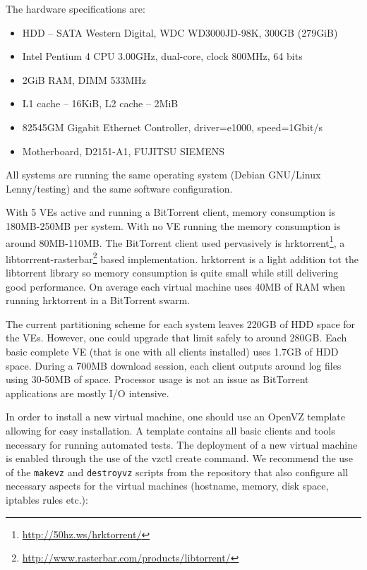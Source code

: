 The hardware specifications are:

\begin{itemize}
  \item HDD -- SATA Western Digital, WDC WD3000JD-98K, 300GB (279GiB)
  \item Intel Pentium 4 CPU 3.00GHz, dual-core, clock 800MHz, 64 bits
  \item 2GiB RAM, DIMM 533MHz
  \item L1 cache -- 16KiB, L2 cache -- 2MiB
  \item 82545GM Gigabit Ethernet Controller, driver=e1000, speed=1Gbit/s
  \item Motherboard, D2151-A1, FUJITSU SIEMENS
\end{itemize}

All systems are running the same operating system (Debian GNU/Linux
Lenny/testing) and the same software configuration.

With 5 VEs active and running a BitTorrent client, memory consumption is
180MB-250MB per system. With no VE running the memory consumption is around
80MB-110MB. The BitTorrent client used pervasively is
hrktorrent\footnote{\url{http://50hz.ws/hrktorrent/}}, a
libtorrrent-rasterbar\footnote{\url{http://www.rasterbar.com/products/libtorrent/}} based implementation. hrktorrent is a light addition tot
the libtorrent library so memory consumption is quite small while still
delivering good performance. On average each virtual machine uses 40MB of RAM
when running hrktorrent in a BitTorrent swarm.

The current partitioning scheme for each system leaves 220GB of HDD space for
the VEs. However, one could upgrade that limit safely to around 280GB. Each
basic complete VE (that is one with all clients installed) uses 1.7GB of HDD
space. During a 700MB download session, each client outputs around log files
using 30-50MB of space. Processor usage is not an issue as BitTorrent
applications are mostly I/O intensive.

In order to install a new virtual machine, one should use an OpenVZ template
allowing for easy installation. A template contains all basic clients and
tools necessary for running automated tests. The deployment of a new virtual
machine is enabled through the use of the vzctl create command. We recommend
the use of the \texttt{makevz} and \texttt{destroyvz} scripts from the
repository that also configure all necessary aspects for the virtual machines
(hostname, memory, disk space, iptables rules etc.):

